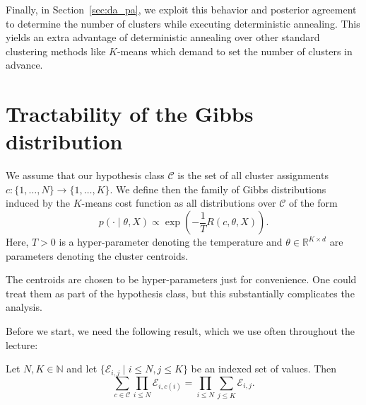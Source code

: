 Finally, in Section~\ref{sec:da_pa}, we exploit this behavior and posterior agreement to determine the number of clusters while executing deterministic annealing. This yields an extra advantage of deterministic annealing over other standard clustering methods like $K$-means which demand to set the number of clusters in advance.

\section{Tractability of the Gibbs distribution}
\label{sec:gibbs_factorizes_da}

We assume that our hypothesis class $\mathcal{C}$ is the set of all cluster assignments $c : \{1, \ldots, N\} \to \{1, \ldots, K\}$.
We define then the family of Gibbs distributions
induced by the $K$-means cost function as all distributions over $\mathcal{C}$ of the
form
%
\begin{equation}
p(\cdot \mid \theta, X) \propto \exp\left(-\frac{1}{T}R(c, \theta, X)\right).
\label{eq:gibbs_distr}
\end{equation}
%
Here, $T > 0$ is a hyper-parameter denoting the temperature and $\theta \in \mathbb{R}^{K \times d}$ are parameters denoting the cluster centroids. 

The centroids are chosen to be hyper-parameters just for convenience.
One could treat them as part of the hypothesis class, but this substantially complicates the analysis.

Before we start, we need the following result, which we use often throughout the lecture:

\begin{lemma}
Let $N, K \in \mathbb{N}$ and let $\{ \mathcal{E}_{i,j} \mid i \leq N, j \leq K\}$ be an indexed set of values. Then
%
\begin{equation}
\sum_{c \in \mathcal{C}} \prod_{i \leq N} \mathcal{E}_{i, c(i)} = \prod_{i \leq N} \sum_{j \leq K} \mathcal{E}_{i,j}.
\label{eq:sum_prod_exchange}
\end{equation}
%
\label{lem:sum_prod_exchange}
\end{lemma}

